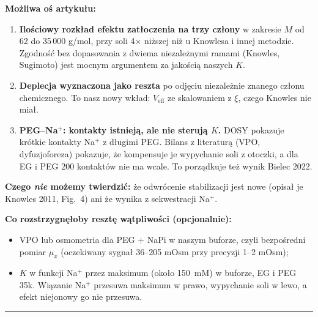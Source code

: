 \documentclass[11pt,a4paper]{article}
\begin{document}
\textbf{Możliwa oś artykułu:}
\begin{enumerate}
\item \textbf{Ilościowy rozkład efektu zatłoczenia na trzy człony} w zakresie $M$ od 62 do 35\,000 g/mol, przy soli 4$\times$ niższej niż u Knowlesa i innej metodzie. Zgodność bez dopasowania z dwiema niezależnymi ramami (Knowles, Sugimoto) jest mocnym argumentem za jakością naszych $K$.
\item \textbf{Deplecja wyznaczona jako reszta} po odjęciu niezależnie znanego członu chemicznego. To nasz nowy wkład: $V_\text{eff}$ ze skalowaniem z $\xi$, czego Knowles nie miał.
\item \textbf{PEG--Na$^+$: kontakty istnieją, ale nie sterują $K$.} DOSY pokazuje krótkie kontakty Na$^+$ z długimi PEG. Bilans z literaturą (VPO, dyfuzjoforeza) pokazuje, że kompensuje je wypychanie soli z otoczki, a dla EG i PEG 200 kontaktów nie ma wcale. To porządkuje też wynik Bielec 2022.
\end{enumerate}

\textbf{Czego \emph{nie} możemy twierdzić:} że odwrócenie stabilizacji jest nowe (opisał je Knowles 2011, Fig.~4) ani że wynika z sekwestracji Na$^+$.

\textbf{Co rozstrzygnęłoby resztę wątpliwości (opcjonalnie):}
\begin{itemize}
\item VPO lub osmometria dla PEG + NaPi w naszym buforze, czyli bezpośredni pomiar $\mu_x$ (oczekiwany sygnał 36--205 mOsm przy precyzji 1--2 mOsm);
\item $K$ w funkcji Na$^+$ przez maksimum (około 150~mM) w buforze, EG i PEG 35k. Wiązanie Na$^+$ przesuwa maksimum w prawo, wypychanie soli w lewo, a efekt niejonowy go nie przesuwa.
\end{itemize}

\vspace{1em}
\hrule
\end{document}
